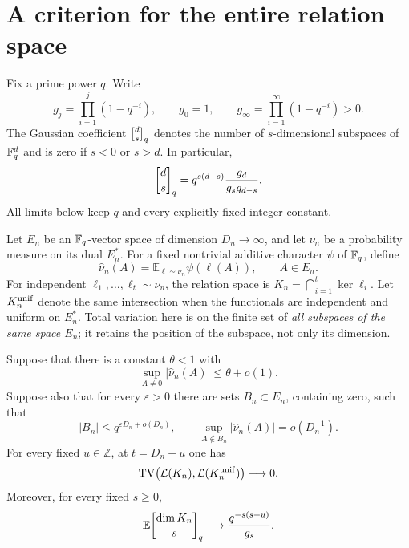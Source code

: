 \section{A criterion for the entire relation space}\label{sec:universality}

Fix a prime power $q$. Write
\[
 g_j=\prod_{i=1}^{j}(1-q^{-i}),\qquad
 g_0=1,\qquad g_\infty=\prod_{i=1}^{\infty}(1-q^{-i})>0.
\]
The Gaussian coefficient $\qbinom{d}{s}$ denotes the number of $s$-dimensional
subspaces of $\mathbb F_q^d$ and is zero if $s<0$ or $s>d$. In particular,
\begin{equation}\label{eq:gaussian}
 \qbinom{d}{s}=q^{s(d-s)}\frac{g_d}{g_sg_{d-s}}.
\end{equation}
All limits below keep $q$ and every explicitly fixed integer constant.

Let $E_n$ be an $\mathbb F_q$-vector space of dimension $D_n\to\infty$, and let
$\nu_n$ be a probability measure on its dual $E_n^*$. For a fixed nontrivial
additive character $\psi$ of $\mathbb F_q$, define
\[
 \widehat\nu_n(A)=\mathbb E_{\ell\sim\nu_n}\psi(\ell(A)),\qquad A\in E_n.
\]
For independent $\ell_1,\ldots,\ell_t\sim\nu_n$, the relation space is
$K_n=\bigcap_{i=1}^{t}\ker\ell_i$. Let $K_n^{\rm unif}$ denote the same
intersection when the functionals are independent and uniform on $E_n^*$.
Total variation here is on the finite set of \emph{all subspaces of the same
space $E_n$}; it retains the position of the subspace, not only its dimension.

\begin{theorem}\label{thm:abstract}
Suppose that there is a constant $\theta<1$ with
\begin{equation}\label{eq:global-bias}
 \sup_{A\ne0}|\widehat\nu_n(A)|\le\theta+o(1).
\end{equation}
Suppose also that for every $\varepsilon>0$ there are sets
$B_n\subset E_n$, containing zero, such that
\begin{equation}\label{eq:exceptional-bias}
 |B_n|\le q^{\varepsilon D_n+o(D_n)},\qquad
 \sup_{A\notin B_n}|\widehat\nu_n(A)|=o(D_n^{-1}).
\end{equation}
For every fixed $u\in\mathbb Z$, at $t=D_n+u$ one has
\[
 \operatorname{TV}\bigl(\mathcal L(K_n),\mathcal L(K_n^{\rm unif})\bigr)\longrightarrow0.
\]
Moreover, for every fixed $s\ge0$,
\begin{equation}\label{eq:moment-limit}
 \mathbb E\qbinom{\dim K_n}{s}
 \longrightarrow\frac{q^{-s(s+u)}}{g_s}.
\end{equation}
\end{theorem}

